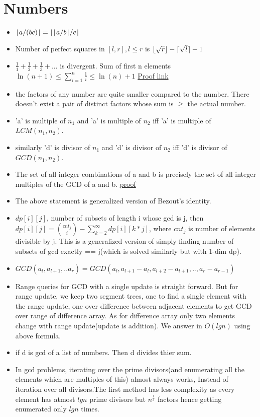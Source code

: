 \documentclass[../Notes.tex]{subfiles}
\begin{document}
\chapter{Numbers}

\begin{itemize}
	\item $\floor*{a/(bc)} = \floor*{\floor*{a/b}/c}$
	\item Number of perfect squares in $[l,r], l\leq r$ is $\lfloor\sqrt{r}\rfloor-\lceil\sqrt{l}\rceil+1$  
	\item $\frac{1}{1}+\frac{1}{2}+\frac{1}{3}+...$ is divergent.
	Sum of first n elements \\
	$\ln(n+1)\le\sum_{i=1}^n\frac1i\le\ln(n)+1$
	\href{./Material/divergent series proof.pdf}{Proof link}
	\item the factors of any number are quite smaller compared to the  number. There doesn't exist a pair of distinct factors whose sum is $\geq$ the actual number.
	\item 'a' is multiple of $n_1$ and 'a' is multiple of $n_2$ iff 'a' is multiple of $LCM(n_1,n_2)$. 
	\item similarly 'd' is divisor of $n_1$ and 'd' is divisor of $n_2$ iff 'd' is divisor of $GCD(n_1,n_2)$.
	\item The set of all integer combinations of a and b is precisely the set of all integer multiples of the GCD of a and b. \href{https://proofwiki.org/wiki/Set_of_Integer_Combinations_equals_Set_of_Multiples_of_GCD}{proof}
	\item The above statement is generalized version of Bezout's identity.
	\item $dp[i][j]$, number of subsets of length i whose gcd is j, then\\
	$dp[i][j]={cnt_j\choose i}-\sum_{k=2}^{\infty}dp[i][k*j]$, where $cnt_j$ is number of elements divisible by j. This is a generalized version of simply finding number of subsets of gcd exactly == j(which is solved similarly but with 1-dim dp).
	\item $GCD(a_l,a_{l+1},..a_r) = GCD(a_l,a_{l+1}-a_l,a_{l+2}-a_{l+1},..,a_r-a_{r-1})$
	\item Range queries for GCD with a single update is straight forward. But for range update, we keep two segment trees, one to find a single element with the range update, one over difference between adjacent elements to get GCD over range of difference array. As for difference array only two elements change with range update(update is addition). We answer in $O(lgn)$ using above formula.
	\item if d is gcd of a list of numbers. Then d divides thier sum.
	\item In gcd problems, iterating over the prime divisors(and enumerating all the elements which are multiples of this) almost always works, Instead of iteration over all divisors.The first method has less complexity as every element has atmost $lgn$ prime divisors but $n^\frac{1}{3}$ factors hence getting enumerated only $lgn$ times.
\end{itemize}
\end{document}
